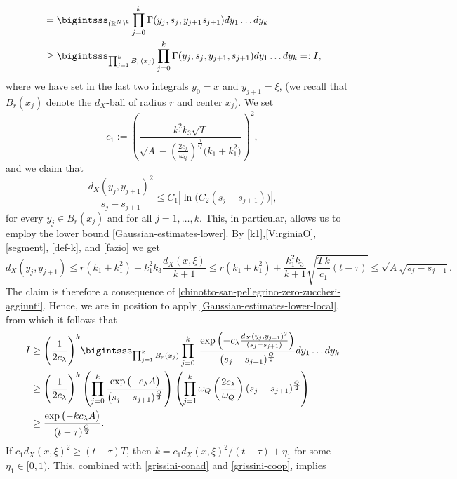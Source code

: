 \documentclass[11pt,a4paper]{article}
\numberwithin{equation}{section}
\def \rn {{\mathbb {R}}^{N}}
\def \G {{\Gamma}}
\def \l {{\lambda}}
\def \t {{\tau}}
\def \x {{\xi}}
\def \y {{\eta}}
\begin{document}
\begin{pf-fundamental}
\begin{equation}
\begin{aligned}
			&= \bigintsss_{(\rn)^k}\prod_{j=0}^{k}\G(y_j,s_j,y_{j+1}s_{j+1})dy_1\ldots dy_k\\
			&\geq \bigintsss_{\prod_{j=1}^k B_r(x_j)}\prod_{j=0}^{k}\G(y_j,s_j,y_{j+1},s_{j+1})dy_1\ldots dy_k =: I,
		\end{aligned}
	\end{equation}
	where we have set in the last two integrals $y_0=x$ and $y_{j+1}=\x$, (we recall that $B_r(x_j)$ denote the $d_X$-ball of radius $r$ and center $x_j$). We set
	\begin{equation}\label{def-c1}
		c_1:=\left(\frac{k^2_1k_3\sqrt{T}}{\sqrt{A}-\left(\frac{2c_\l}{\omega_Q}\right)^\frac{1}{Q}\Big(k_1+k_1^2\Big)}\right)^2,
	\end{equation}	
	and we claim that
	\begin{equation}
		\frac{d_X(y_j,y_{j+1})^2}{s_j-s_{j+1}} \leq C_1 \left|\ln\Big(C_2(s_j-s_{j+1})\Big)\right|,
	\end{equation}
	for every $y_j\in B_r(x_j)$ and for all $j=1,\ldots,k$. This, in particular, allows us to employ the lower bound \eqref{Gaussian-estimates-lower}. By \eqref{k1},\eqref{VirginiaO}, \eqref{segment}, \eqref{def-k}, and \eqref{fazio} we get 
	\begin{equation}
		d_X(y_j,y_{j+1})\leq r(k_1+k_1^2)+k_1^2k_3 \frac{d_X(x,\x)}{k+1} \leq r(k_1+k_1^2)+\frac{k_1^2k_3}{k+1}\sqrt{\frac{T\,k}{c_1}(t-\t)}\leq \sqrt{A} \sqrt{s_j-s_{j+1}}.
	\end{equation}
	The claim is therefore a consequence of \eqref{chinotto-san-pellegrino-zero-zuccheri-aggiunti}. Hence, we are in position to apply \eqref{Gaussian-estimates-lower-local}, from which it follows that
	\begin{equation}\label{grissini-coop}
		\begin{aligned}
			I&\geq \Bigg(\frac{1}{2c_\l}\Bigg)^k \bigintsss_{\prod_{j=1}^k B_r(x_j)}\prod_{j=0}^{k}\;\frac{\exp{\left(-c_\l\frac{d_X(y_j,y_{j+1})^2}{(s_j-s_{j+1})}\right)}}{\big(s_j-s_{j+1})^{\frac{Q}{2}}}dy_1\ldots dy_k\\
			&\geq \Bigg(\frac{1}{2c_\l}\Bigg)^k \left(\prod_{j=0}^{k} \frac{\exp\big({-c_\l A}\big)}{\big(s_j-s_{j+1})^{\frac{Q}{2}}}\right)\left(\prod_{j=1}^k\omega_Q\left(\frac{2c_\l}{\omega_Q}\right) (s_j-s_{j+1})^\frac{Q}{2}\right)\\
			&\geq\frac{\exp\big({-kc_\l A}\big)}{(t-\t)^\frac{Q}{2}}.
		\end{aligned}
	\end{equation}
	If $c_1d_X(x,\x)^2\geq (t-\t)T$, then $k = c_1d_X(x,\x)^2/ (t-\t)+\y_1$ for some $\y_1\in [0,1)$. This, combined with \eqref{grissini-conad} and \eqref{grissini-coop}, implies

\end{pf-fundamental}
\end{document}
